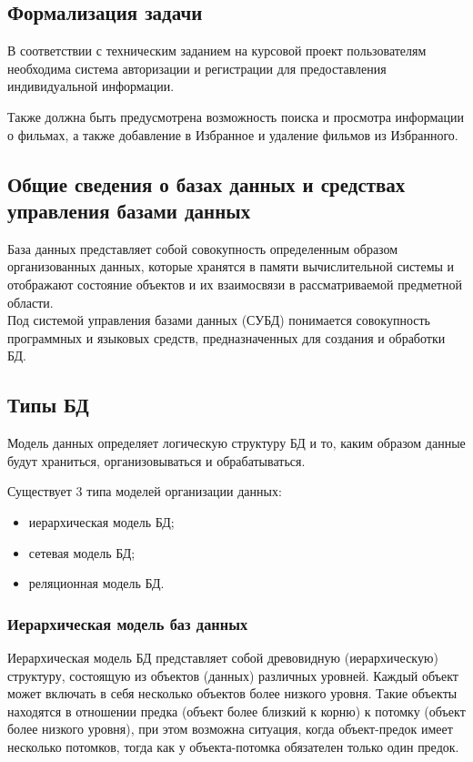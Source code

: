 \documentclass[a4paper, 14pt]{article}
\begin{document}
	\subsection{Формализация задачи}
	
	В соответствии с техническим заданием на курсовой проект пользователям необходима система авторизации и регистрации для предоставления индивидуальной информации.
	
	Также должна быть предусмотрена возможность поиска и просмотра информации о фильмах, а также добавление в Избранное и удаление фильмов из Избранного.
	
	\subsection{Общие сведения о базах данных и средствах управления базами данных}%
	
	База данных представляет собой совокупность определенным образом организованных данных, которые хранятся в памяти вычислительной системы и отображают состояние объектов и их взаимосвязи в рассматриваемой предметной области.\\
	Под системой управления базами данных (СУБД) понимается совокупность программных и языковых средств, предназначенных для создания и обработки БД. 
	
	\subsection{Типы БД}
	
	Модель данных определяет логическую структуру БД и то, каким образом данные будут храниться, организовываться и обрабатываться. 
	
	Существует 3 типа моделей организации данных:
	\begin{itemize}
		\item иерархическая модель БД;
		\item сетевая модель БД;
		\item реляционная модель БД.
	\end{itemize}
	
	\subsubsection{Иерархическая модель баз данных}
	
	Иерархическая модель БД представляет собой древовидную (иерархическую) структуру, состоящую из объектов (данных) различных уровней. Каждый объект может включать в себя несколько объектов более низкого уровня. Такие объекты находятся в отношении предка (объект более близкий к корню) к потомку (объект более низкого уровня), при этом возможна ситуация, когда объект-предок имеет несколько потомков, тогда как у объекта-потомка обязателен только один предок.
	
\end{document}
